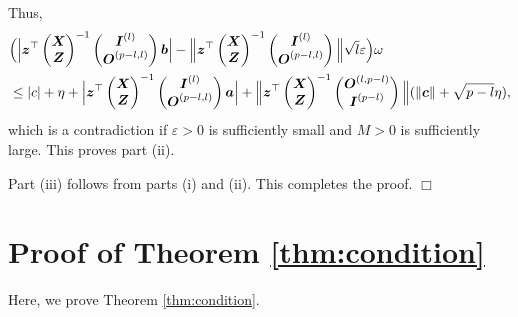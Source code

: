 \documentclass[12pt]{article}
\def\ep{{\varepsilon}}
\def\ep{{\varepsilon}}
\def\om{{\omega}}
\def\non{{\nonumber}}
\def\ep{{\varepsilon}}
\def\om{{\omega}}
\def\a{{\text{\boldmath $a$}}}
\def\b{{\text{\boldmath $b$}}}
\def\c{{\text{\boldmath $c$}}}
\def\z{{\text{\boldmath $z$}}}
\def\I{{\text{\boldmath $I$}}}
\def\O{{\text{\boldmath $O$}}}
\def\X{{\text{\boldmath $X$}}}
\def\Z{{\text{\boldmath $Z$}}}
\def\non{{\nonumber}}
\begin{document}
Thus, 
\begin{align}
&\Big( \Big| \z ^{\top } \begin{pmatrix} \X \\ \Z \end{pmatrix} ^{- 1} \begin{pmatrix} \I ^{(l)} \\ \O ^{(p - l, l)} \end{pmatrix} \b \Big| - \Big\| \z ^{\top } \begin{pmatrix} \X \\ \Z \end{pmatrix} ^{- 1} \begin{pmatrix} \I ^{(l)} \\ \O ^{(p - l, l)} \end{pmatrix} \Big\| \sqrt{l} \ep \Big) \om \non \\
&\le |c| + \eta + \Big| \z ^{\top } \begin{pmatrix} \X \\ \Z \end{pmatrix} ^{- 1} \begin{pmatrix} \I ^{(l)} \\ \O ^{(p - l, l)} \end{pmatrix} \a \Big| + \Big\| \z ^{\top } \begin{pmatrix} \X \\ \Z \end{pmatrix} ^{- 1} \begin{pmatrix} \O ^{(l, p - l)} \\ \I ^{(p - l)} \end{pmatrix} \Big\| ( \| \c \| + \sqrt{p - l} \eta ) \text{,} \non 
\end{align}
which is a contradiction if $\ep > 0$ is sufficiently small and $M > 0$ is sufficiently large. 
This proves part (ii). 

Part (iii) follows from parts (i) and (ii). 
This completes the proof. 
\hfill$\Box$




\section{Proof of Theorem \ref{thm:condition}}

Here, we prove Theorem \ref{thm:condition}. 


\bigskip
\end{document}
